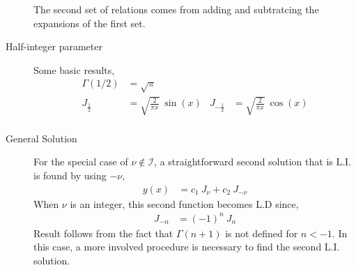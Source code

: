 \begin{description}
        The second set of relations comes from adding and subtratcing the expansions of
        the first set.
    \item[Half-integer parameter] Some basic results,
        \begin{align}
            \Gamma(1/2)      & = \sqrt{\pi}                        \\
            J_{\frac{1}{2}}  & = \sqrt{\frac{2}{\pi x}}\ \sin(x) &
            J_{-\frac{1}{2}} & = \sqrt{\frac{2}{\pi x}}\ \cos(x)   \\
        \end{align}
    \item[General Solution] For the special case of $ \nu \not\in \mathcal{I} $, a
        straightforward second solution that is L.I. is found by using $ -\nu $,
        \begin{align}
            y(x) & = c_1\ J_\nu + c_2\ J_{-\nu}
        \end{align}
        When $ \nu $ is an integer, this second function becomes L.D since,
        \begin{align}
            J_{-n} & = (-1)^n\ J_n
        \end{align}
        Result follows from the fact that $ \Gamma(n+1) $ is not defined for $ n < -1 $.
        In this case, a more involved procedure is necessary to find the second L.I.
        solution.
\end{description}


